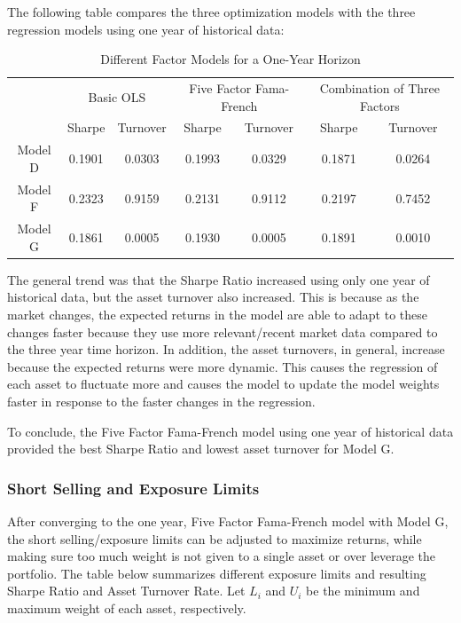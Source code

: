 \documentclass[10pt]{article}
\begin{document}
The following table compares the three optimization models with the three regression models using one year of historical data:\bigskip
\begin{table}[!htbp]
\footnotesize
\centering
\begin{tabular}{c | c c | c c  | c c } 
\hline 
\rule{0pt}{3ex}  \multirow{2}{*}{\textbf{Model}} & \multicolumn{2}{c|}{Basic OLS} & \multicolumn{2}{c|}{Five Factor Fama-French} & \multicolumn{2}{c}{Combination of Three Factors} \\[1ex]\cline{2-7} 
\rule{0pt}{3ex} &  Sharpe  &  Turnover &  Sharpe  &  Turnover & Sharpe  &  Turnover  \\[1ex]
\hline 
\rule{0pt}{3ex}Model D   & 0.1901&0.0303&0.1993&0.0329&0.1871&0.0264 \\ [1ex]
Model F   & 0.2323&0.9159&0.2131&0.9112&0.2197&0.7452\\ [1ex]
Model G   &0.1861&0.0005&0.1930&0.0005&0.1891&0.0010 \\ [1ex]
\hline
\end{tabular}
\caption{Different Factor Models for a One-Year Horizon}
\label{table:results}
\end{table}

The general trend was that the Sharpe Ratio increased using only one year of historical data, but the asset turnover also increased. This is because as the market changes, the expected returns in the model are able to adapt to these changes faster because they use more relevant/recent market data compared to the three year time horizon. In addition, the asset turnovers, in general, increase because the expected returns were more dynamic. This causes the regression of each asset to fluctuate more and causes the model to update the model weights faster in response to the faster changes in the regression.\bigskip

To conclude, the Five Factor Fama-French model using one year of historical data provided the best Sharpe Ratio and lowest asset turnover for Model G. 
\subsubsection{Short Selling and Exposure Limits}
After converging to the one year, Five Factor Fama-French model with Model G,  the short selling/exposure limits can be adjusted to maximize returns, while making sure too much weight is not given to a single asset or over leverage the portfolio. The table below summarizes different exposure limits and resulting Sharpe Ratio and Asset Turnover Rate. Let $L_i$ and $U_i$ be the minimum and maximum weight of each asset, respectively.\bigskip
\end{document}
